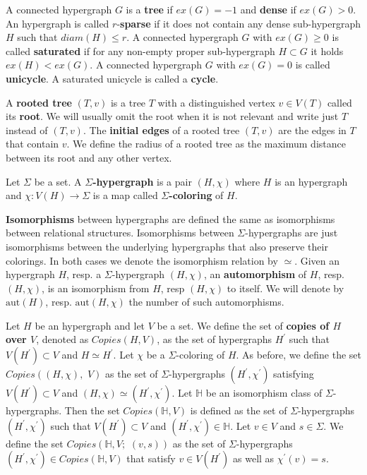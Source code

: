 \documentclass[12pt,notitlepage,a4paper]{article}
\theoremstyle{definition}
\newcommand{\aut}{\mathrm{aut}}
\begin{document}
\par
A connected hypergraph $G$ is a \textbf{tree} if $ex(G)=-1$ and \textbf{dense} if $ex(G)>0$.
An hypergraph is called $r$-\textbf{sparse} if it does not contain any dense sub-hypergraph $H$
such that $diam(H)\leq r$.
A connected hypergraph $G$ with $ex(G)\geq 0$ is called \textbf{saturated} 
if for any non-empty proper sub-hypergraph
$H\subset G$ it holds $ex(H)<ex(G)$. 
A connected hypergraph $G$ with $ex(G)=0$ is called \textbf{unicycle}. 
A saturated unicycle is called a \textbf{cycle}. \par
A \textbf{rooted tree} $(T,v)$ is a tree $T$ with a 
distinguished vertex $v\in V(T)$ called its \textbf{root}.
We will usually omit the root when it is not relevant and 
write just $T$ instead of $(T,v)$. The
\textbf{initial edges} of a rooted tree $(T,v)$ are 
the edges in $T$ that contain $v$. 
We define the radius of a rooted tree
as the maximum distance between its root
and any other vertex.
\par


Let $\Sigma$ be a set. A \textbf{$\Sigma$-hypergraph}
is a pair $(H, \chi)$ where $H$ is an hypergraph
and $\chi: V(H)\rightarrow \Sigma$ is a map 
called \textbf{$\Sigma$-coloring} of $H$. \par


\textbf{Isomorphisms} between hypergraphs are defined the same as 
isomorphisms between relational structures. Isomorphisms between $\Sigma$-hypergraphs are just
isomorphisms between the underlying hypergraphs that also preserve their colorings. 
In both cases we denote the isomorphism relation by $\simeq$. 
Given an hypergraph $H$, resp. a $\Sigma$-hypergraph $(H, \chi)$,
an \textbf{automorphism} of $H$, resp. $(H,\chi)$,
is an isomorphism from $H$, resp $(H,\chi)$ to itself.
We will denote by $\aut(H)$, resp. $\aut(H,\chi)$
 the number of such automorphisms. \par

Let $H$ be an hypergraph and let $V$ be a set. We define the
set of \textbf{copies of $H$ over $V$}, denoted as $Copies(H,V)$, 
as the set of hypergraphs 
$H^\prime$ such that
$V(H^\prime)\subset V$ and $H\simeq H^\prime$. Let 
$\chi$ be a $\Sigma$-coloring of $H$. 
As before, we define the set $Copies\left(
(H,\chi),\, \, V\right)$ as the set of $\Sigma$-hypergraphs
$(H^\prime,\chi^\prime)$ satisfying $V(H^\prime)\subset V$ and
$(H,\chi)\simeq (H^\prime,\chi^\prime)$. Let $\mathbb{H}$ be 
an isomorphism class of $\Sigma$-hypergraphs. Then the set
$Copies(\mathbb{H}, V)$ is defined as the set of $\Sigma$-hypergraphs
$(H^\prime,\chi^\prime)$ such that 
$V(H^\prime)\subset V$ and
$(H^\prime,\chi^\prime)\in \mathbb{H}$. 
Let $v\in V$ and $s\in \Sigma$. We define the
set $Copies\left(\mathbb{H}, V;\,\, (v,s)\right)$ 
as the set of $\Sigma$-hypergraphs
$(H^\prime,\chi^\prime)\in Copies(\mathbb{H}, V)$
that satisfy $v\in V(H^\prime)$ as well as
$\chi^\prime(v)=s$. \par
\end{document}

